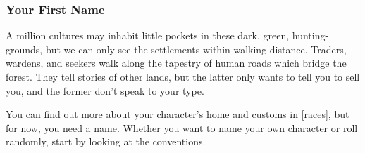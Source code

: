 \begin{multicols}{2}


\subsubsection{Your First Name}
\label{raceRoll}%
A million cultures may inhabit little pockets in these dark, green, hunting-grounds, but we can only see the settlements within walking distance.
Traders, \glspl{warden}, and \glspl{seeker} walk along the tapestry of human roads which bridge the forest.
They tell stories of other lands, but the latter only wants to tell you to sell you, and the former don't speak to your type.

You can find out more about your character's home and customs in \autoref{races}, but for now, you need a name.
Whether you want to name your own character or roll randomly, start by looking at the conventions.

\end{multicols}

\newpage

